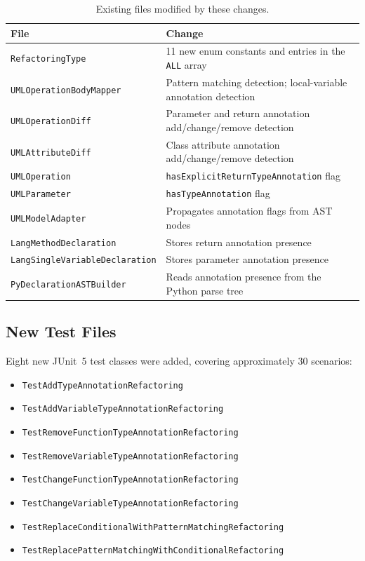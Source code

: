 \documentclass[11pt,a4paper]{article}
\newcommand{\code}[1]{\texttt{#1}}
\begin{document}
\begin{table}[ht]
  \centering
  \caption{Existing files modified by these changes.}
  \small
  \begin{tabular}{@{}ll@{}}
    \toprule
    \textbf{File} & \textbf{Change} \\
    \midrule
    \code{RefactoringType}              & 11 new enum constants and entries in the \code{ALL} array \\
    \code{UMLOperationBodyMapper}       & Pattern matching detection; local-variable annotation detection \\
    \code{UMLOperationDiff}             & Parameter and return annotation add/change/remove detection \\
    \code{UMLAttributeDiff}             & Class attribute annotation add/change/remove detection \\
    \code{UMLOperation}                 & \code{hasExplicitReturnTypeAnnotation} flag \\
    \code{UMLParameter}                 & \code{hasTypeAnnotation} flag \\
    \code{UMLModelAdapter}              & Propagates annotation flags from AST nodes \\
    \code{LangMethodDeclaration}        & Stores return annotation presence \\
    \code{LangSingleVariableDeclaration}& Stores parameter annotation presence \\
    \code{PyDeclarationASTBuilder}      & Reads annotation presence from the Python parse tree \\
    \bottomrule
  \end{tabular}
\end{table}

\subsection{New Test Files}

Eight new JUnit~5 test classes were added, covering approximately 30 scenarios:

\begin{itemize}[leftmargin=*, itemsep=1pt]
  \item \code{TestAddTypeAnnotationRefactoring}
  \item \code{TestAddVariableTypeAnnotationRefactoring}
  \item \code{TestRemoveFunctionTypeAnnotationRefactoring}
  \item \code{TestRemoveVariableTypeAnnotationRefactoring}
  \item \code{TestChangeFunctionTypeAnnotationRefactoring}
  \item \code{TestChangeVariableTypeAnnotationRefactoring}
  \item \code{TestReplaceConditionalWithPatternMatchingRefactoring}
  \item \code{TestReplacePatternMatchingWithConditionalRefactoring}
\end{itemize}
\end{document}

